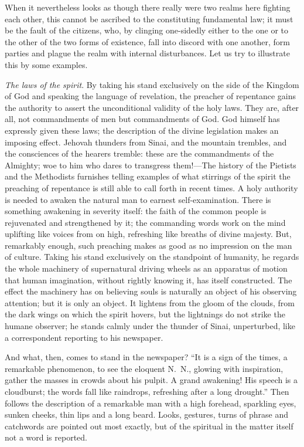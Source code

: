 \documentclass[12pt,a4paper,openany]{book}
\newcommand{\opage}[1]{\marginnote{\footnotesize\textit{[#1]}}}
\begin{document}
When it nevertheless looks as though there really were two realms here
fighting each other, this cannot be ascribed to the constituting
fundamental law; it must be the fault of the citizens, who, by clinging
one-sidedly either to the one or to the other of the two forms of
existence, fall into discord with one another, form \opage{99}parties and plague the
realm with internal disturbances. Let us try to illustrate this by some
examples.

\emph{The laws of the spirit}. By taking his stand exclusively on the side
of the Kingdom of God and speaking the language of revelation, the
preacher of repentance gains the authority to assert the unconditional
validity of the holy laws. They are, after all, not commandments of men
but commandments of God. God himself has expressly given these laws; the
description of the divine legislation makes an imposing effect. Jehovah
thunders from Sinai, and the mountain trembles, and the consciences of
the hearers tremble: these are the commandments of the Almighty; woe to
him who dares to transgress them!---The history of the Pietists and the
Methodists furnishes telling examples of what stirrings of the spirit the
preaching of repentance is still able to call forth in recent times. A
holy authority is needed to awaken the natural man to earnest
self-examination. There is something awakening in severity itself: the
faith of the common people is rejuvenated and strengthened by it; the
commanding words work on the mind uplifting like voices from on high,
refreshing like breaths of divine majesty. But, remarkably enough, such
preaching makes as good as no impression on the man of culture. Taking
his stand exclusively on the standpoint of humanity, he regards the whole
machinery of supernatural driving wheels as an apparatus of motion that
human imagination, without rightly knowing it, has itself constructed.
The effect the machinery has on believing souls is naturally an object of
his observing attention; but it is only an object. It lightens from the
gloom of the clouds, from the dark wings on which the spirit hovers, but
the lightnings do not strike the humane \opage{100}observer; he stands calmly under
the thunder of Sinai, unperturbed, like a correspondent reporting to his
newspaper.

And what, then, comes to stand in the newspaper? ``It is a sign of the
times, a remarkable phenomenon, to see the eloquent N.~N., glowing with
inspiration, gather the masses in crowds about his pulpit. A grand
awakening! His speech is a cloudburst; the words fall like raindrops,
refreshing after a long drought.'' Then follows the description of a
remarkable man with a high forehead, sparkling eyes, sunken cheeks, thin
lips and a long beard. Looks, gestures, turns of phrase and catchwords
are pointed out most exactly, but of the spiritual in the matter itself
not a word is reported.
\end{document}
